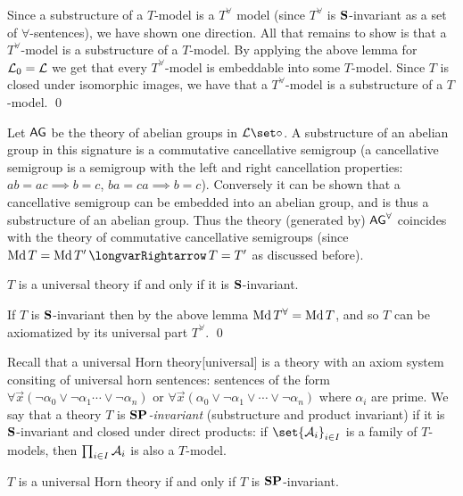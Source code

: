 \elemm

Since a substructure of a $T$-model is a $T^\forall$ model (since $T^\forall$ is ${\bf S}$-invariant as a set of $\forall$-sentences), we have shown one direction.
All that remains to show is that a $T^\forall$-model is a substructure of a $T$-model.
By applying the above lemma for ${\cal L}_0={\cal L}$ we get that every $T^\forall$-model is embeddable into some $T$-model.
Since $T$ is closed under isomorphic images, we have that a $T^\forall$-model is a substructure of a $T$-model.
\qed

\bexam

    Let ${\sf AG}$ be the theory of abelian groups in ${\cal L}\set\circ$.
    A substructure of an abelian group in this signature is a commutative cancellative semigroup (a cancellative semigroup is a semigroup with the left and right cancellation properties: $ab=ac\implies b=c$,
    $ba=ca\implies b=c$).
    Conversely it can be shown that a cancellative semigroup can be embedded into an abelian group, and is thus a substructure of an abelian group.
    Thus the theory (generated by) ${\sf AG}^\forall$ coincides with the theory of commutative cancellative semigroups (since $\Md T=\Md T'\implies T=T'$ as discussed before).

\eexam

\bthrm[name=universalpartembedtheorem]

    $T$ is a universal theory if and only if it is ${\bf S}$-invariant.

\ethrm

If $T$ is ${\bf S}$-invariant then by the above lemma $\mathop{\rm Md} T^\forall=\mathop{\rm Md} T$, and so $T$ can be axiomatized by its universal part $T^\forall$.
\qed

Recall that a universal Horn theory[universal] is a theory with an axiom system consiting of universal horn sentences: sentences of the form
$\forall\vec x(\neg\alpha_0\lor\neg\alpha_1\cdots\lor\neg\alpha_n)$ or $\forall\vec x(\alpha_0\lor\neg\alpha_1\lor\cdots\lor\neg\alpha_n)$ where $\alpha_i$ are prime.
We say that a theory $T$ is {\it ${\bf SP}$-invariant} (substructure and product invariant) if it is ${\bf S}$-invariant and closed under direct products: if
$\set{{\cal A}_i}_{i\in I}$ is a family of $T$-models, then $\prod_{i\in I}{\cal A}_i$ is also a $T$-model.

\bthrm

    $T$ is a universal Horn theory if and only if $T$ is ${\bf SP}$-invariant.

